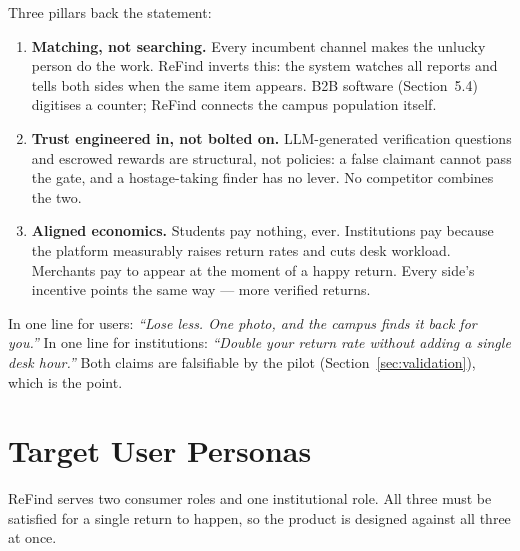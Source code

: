 \documentclass[11pt,a4paper]{article}
\begin{document}
Three pillars back the statement:

\begin{enumerate}
  \item \textbf{Matching, not searching.} Every incumbent channel makes the unlucky
        person do the work. ReFind inverts this: the system watches all reports and tells
        both sides when the same item appears. B2B software (Section~5.4) digitises a
        counter; ReFind connects the campus population itself.
  \item \textbf{Trust engineered in, not bolted on.} LLM-generated verification questions
        and escrowed rewards are structural, not policies: a false claimant cannot pass
        the gate, and a hostage-taking finder has no lever. No competitor combines the
        two.
  \item \textbf{Aligned economics.} Students pay nothing, ever. Institutions pay because
        the platform measurably raises return rates and cuts desk workload. Merchants pay
        to appear at the moment of a happy return. Every side's incentive points the same
        way --- more verified returns.
\end{enumerate}

In one line for users: \textit{``Lose less. One photo, and the campus finds it back for
you.''} In one line for institutions: \textit{``Double your return rate without adding a
single desk hour.''} Both claims are falsifiable by the pilot (Section~\ref{sec:validation}),
which is the point.

\section{Target User Personas}

ReFind serves two consumer roles and one institutional role. All three must be satisfied
for a single return to happen, so the product is designed against all three at once.
\end{document}
